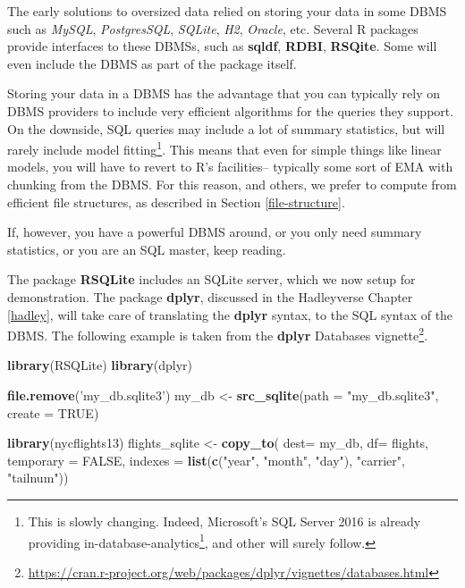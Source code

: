 \documentclass[]{book}
\newenvironment{Shaded}{\begin{snugshade}}{\end{snugshade}}
\newcommand{\DataTypeTok}[1]{\textcolor[rgb]{0.13,0.29,0.53}{#1}}
\newcommand{\KeywordTok}[1]{\textcolor[rgb]{0.13,0.29,0.53}{\textbf{#1}}}
\newcommand{\NormalTok}[1]{#1}
\newcommand{\OtherTok}[1]{\textcolor[rgb]{0.56,0.35,0.01}{#1}}
\newcommand{\StringTok}[1]{\textcolor[rgb]{0.31,0.60,0.02}{#1}}
\renewcommand{\href}[2]{#2\footnote{\url{#1}}}
\theoremstyle{definition}
\theoremstyle{definition}
\theoremstyle{definition}
\theoremstyle{remark}
\begin{document}
The early solutions to oversized data relied on storing your data in some DBMS such as \emph{MySQL}, \emph{PostgresSQL}, \emph{SQLite}, \emph{H2}, \emph{Oracle}, etc.
Several R packages provide interfaces to these DBMSs, such as \textbf{sqldf}, \textbf{RDBI}, \textbf{RSQite}.
Some will even include the DBMS as part of the package itself.

Storing your data in a DBMS has the advantage that you can typically rely on DBMS providers to include very efficient algorithms for the queries they support.
On the downside, SQL queries may include a lot of summary statistics, but will rarely include model fitting\footnote{This is slowly changing. Indeed, Microsoft's SQL Server 2016 is already providing \href{https://blogs.technet.microsoft.com/dataplatforminsider/2016/03/29/in-database-advanced-analytics-with-r-in-sql-server-2016/}{in-database-analytics}, and other will surely follow.}.
This means that even for simple things like linear models, you will have to revert to R's facilities-- typically some sort of EMA with chunking from the DBMS.
For this reason, and others, we prefer to compute from efficient file structures, as described in Section \ref{file-structure}.

If, however, you have a powerful DBMS around, or you only need summary statistics, or you are an SQL master, keep reading.

The package \textbf{RSQLite} includes an SQLite server, which we now setup for demonstration.
The package \textbf{dplyr}, discussed in the Hadleyverse Chapter \ref{hadley}, will take care of translating the \textbf{dplyr} syntax, to the SQL syntax of the DBMS.
The following example is taken from the \textbf{dplyr} \href{https://cran.r-project.org/web/packages/dplyr/vignettes/databases.html}{Databases vignette}.

\begin{Shaded}
\begin{Highlighting}[]
\KeywordTok{library}\NormalTok{(RSQLite)}
\KeywordTok{library}\NormalTok{(dplyr)}

\KeywordTok{file.remove}\NormalTok{(}\StringTok{'my_db.sqlite3'}\NormalTok{)}
\NormalTok{my_db <-}\StringTok{ }\KeywordTok{src_sqlite}\NormalTok{(}\DataTypeTok{path =} \StringTok{"my_db.sqlite3"}\NormalTok{, }\DataTypeTok{create =} \OtherTok{TRUE}\NormalTok{)}

\KeywordTok{library}\NormalTok{(nycflights13)}
\NormalTok{flights_sqlite <-}\StringTok{ }\KeywordTok{copy_to}\NormalTok{(}
  \DataTypeTok{dest=}\NormalTok{ my_db, }
  \DataTypeTok{df=}\NormalTok{ flights, }
  \DataTypeTok{temporary =} \OtherTok{FALSE}\NormalTok{, }
  \DataTypeTok{indexes =} \KeywordTok{list}\NormalTok{(}\KeywordTok{c}\NormalTok{(}\StringTok{"year"}\NormalTok{, }\StringTok{"month"}\NormalTok{, }\StringTok{"day"}\NormalTok{), }\StringTok{"carrier"}\NormalTok{, }\StringTok{"tailnum"}\NormalTok{))}
\end{Highlighting}
\end{Shaded}
\end{document}
